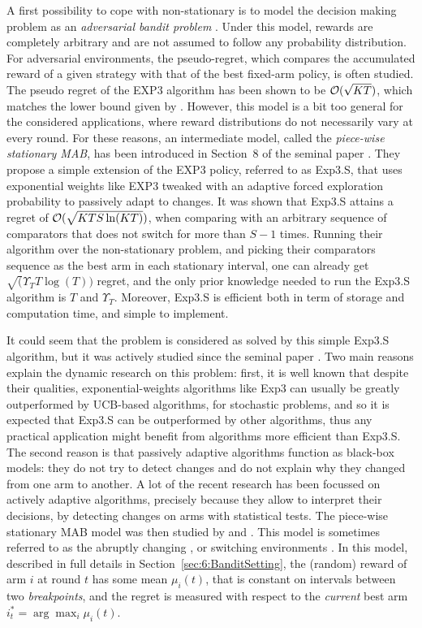 A first possibility to cope with non-stationary is to model the decision making problem as an \emph{adversarial bandit problem} \cite{Auer02NonStochastic}. Under this model, rewards are completely arbitrary and are not assumed to follow any probability distribution.
For adversarial environments, the pseudo-regret, which compares the accumulated reward of a given strategy with that of the best fixed-arm policy, is often studied. The pseudo regret of the EXP3 algorithm has been shown to be $\mathcal{O}(\sqrt{KT})$, which matches the lower bound given by \cite{Auer02NonStochastic}.
However, this model is a bit too general for the considered applications, where reward distributions do not necessarily vary at every round.
For these reasons, an intermediate model, called the \emph{piece-wise stationary MAB}, has been introduced in Section~8 of the seminal paper \cite{Auer02NonStochastic}.
They propose a simple extension of the EXP3 policy, referred to as Exp3.S, that uses exponential weights like EXP3 tweaked with an adaptive forced exploration probability to passively adapt to changes.
It was shown that Exp3.S attains a regret of $\mathcal{O}(\sqrt{K T S \ln(K T)})$, when comparing with an arbitrary sequence of comparators that does not switch for more than $S-1$ times.
Running their algorithm over the non-stationary problem, and picking their comparators sequence as the best arm in each stationary interval, one can already get $\sqrt(\Upsilon_T T \log(T))$ regret, and the only prior knowledge needed to run the Exp3.S algorithm is $T$ and $\Upsilon_T$. Moreover, Exp3.S is efficient both in term of storage and computation time, and simple to implement.

It could seem that the problem is considered as solved by this simple Exp3.S algorithm, but it was actively studied since the seminal paper \cite{Auer02NonStochastic}.
Two main reasons explain the dynamic research on this problem:
first, it is well known that despite their qualities, exponential-weights algorithms like Exp3 can usually be greatly outperformed by UCB-based algorithms, for stochastic problems, and so it is expected that Exp3.S can be outperformed by other algorithms, thus any practical application might benefit from algorithms more efficient than Exp3.S.
%
The second reason is that passively adaptive algorithms function as black-box models: they do not try to detect changes and do not explain why they changed from one arm to another. A lot of the recent research has been focussed on actively adaptive algorithms, precisely because they allow to interpret their decisions, by detecting changes on arms with statistical tests.
The piece-wise stationary MAB model was then studied by \cite{Kocsis06} and \cite{YuMannor09}.
%
This model is sometimes referred to as the abruptly changing \cite{WeiSrivastava18Abruptly}, or switching environments \cite{MellorShapiro13}.
%
In this model, described in full details in Section~\ref{sec:6:BanditSetting}, the (random) reward of arm $i$ at round $t$ has some mean $\mu_i(t)$, that is constant on intervals between two \emph{breakpoints}, and the regret is measured with respect to the \emph{current} best arm $i_t^* = \arg\max_{i} \mu_i(t)$.

